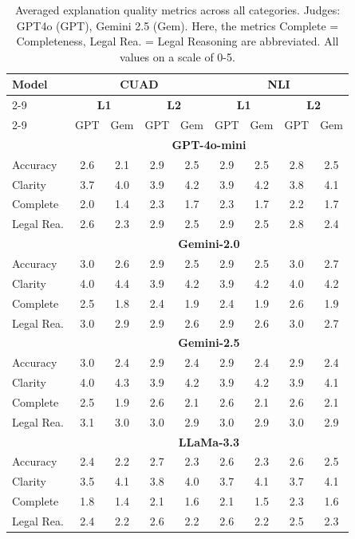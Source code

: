 \documentclass[11pt]{article}
\begin{document}
\begin{table}[h!]
\centering
\setlength{\aboverulesep}{0pt}
\setlength{\belowrulesep}{0pt}
\setlength{\tabcolsep}{2.2pt}
\small
\begin{tabular}{l|cccc|cccc}
\hline
\multirow{3}{*}{\textbf{Model}} &
\multicolumn{4}{c|}{\textbf{CUAD}} &
\multicolumn{4}{c}{\textbf{NLI}} \\
\cline{2-9}
 & \multicolumn{2}{c|}{\textbf{L1}} &
  \multicolumn{2}{c|}{\textbf{L2}} &
  \multicolumn{2}{c|}{\textbf{L1}} &
  \multicolumn{2}{c}{\textbf{L2}} \\
\cline{2-9}
 & GPT & Gem & GPT & Gem &
  GPT & Gem & GPT & Gem \\
\hline
\rowcolor{lightestgray}
\cellcolor{white} & \multicolumn{8}{c}{\textbf{GPT-4o-mini}} \\
Accuracy & 2.6 & 2.1 & 2.9 & 2.5 & 2.9 & 2.5 & 2.8 & 2.5 \\
Clarity & 3.7 & 4.0 & 3.9 & 4.2 & 3.9 & 4.2 & 3.8 & 4.1 \\
Complete & 2.0 & 1.4 & 2.3 & 1.7 & 2.3 & 1.7 & 2.2 & 1.7 \\
Legal Rea. & 2.6 & 2.3 & 2.9 & 2.5 & 2.9 & 2.5 & 2.8 & 2.4 \\
\hline
\rowcolor{lightestgray}
\cellcolor{white} & \multicolumn{8}{c}{\textbf{Gemini-2.0}} \\
Accuracy & 3.0 & 2.6 & 2.9 & 2.5 & 2.9 & 2.5 & 3.0 & 2.7 \\
Clarity & 4.0 & 4.4 & 3.9 & 4.2 & 3.9 & 4.2 & 4.0 & 4.2 \\
Complete & 2.5 & 1.8 & 2.4 & 1.9 & 2.4 & 1.9 & 2.6 & 1.9 \\
Legal Rea. & 3.0 & 2.9 & 2.9 & 2.6 & 2.9 & 2.6 & 3.0 & 2.7 \\
\hline
\rowcolor{lightestgray}
\cellcolor{white} & \multicolumn{8}{c}{\textbf{Gemini-2.5}} \\
Accuracy & 3.0 & 2.4 & 2.9 & 2.4 & 2.9 & 2.4 & 2.9 & 2.4 \\
Clarity & 4.0 & 4.3 & 3.9 & 4.2 & 3.9 & 4.2 & 3.9 & 4.1 \\
Complete & 2.5 & 1.9 & 2.6 & 2.1 & 2.6 & 2.1 & 2.6 & 2.1 \\
Legal Rea. & 3.1 & 3.0 & 3.0 & 2.9 & 3.0 & 2.9 & 3.0 & 2.9 \\
\hline
\rowcolor{lightestgray}
\cellcolor{white} & \multicolumn{8}{c}{\textbf{LLaMa-3.3}} \\
Accuracy & 2.4 & 2.2 & 2.7 & 2.3 & 2.6 & 2.3 & 2.6 & 2.5 \\
Clarity & 3.5 & 4.1 & 3.8 & 4.0 & 3.7 & 4.1 & 3.7 & 4.1 \\
Complete & 1.8 & 1.4 & 2.1 & 1.6 & 2.1 & 1.5 & 2.3 & 1.6 \\
Legal Rea. & 2.4 & 2.2 & 2.6 & 2.2 & 2.6 & 2.2 & 2.5 & 2.3 \\
\hline
\end{tabular}
\caption{ Averaged explanation quality metrics across all categories. Judges: GPT4o (GPT), Gemini 2.5 (Gem). Here, the metrics Complete = Completeness, Legal Rea. = Legal Reasoning are abbreviated. All values on a scale of 0-5.}
\label{tab:eval3_explanation_collapsed}
\end{table}
\end{document}
